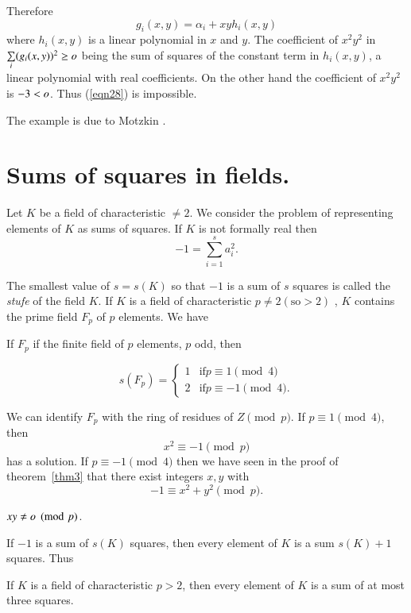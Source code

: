 Therefore
$$
g_i(x,y)=\alpha_i+xy h_i(x,y)
$$
where $h_i(x,y)$ is a linear polynomial in $x$ and $y$. The
coefficient of $x^{2}y^{2}$ in $\sum\limits_{i}(g_i(x,y))^{2}\geq o$
being the sum of squares of the constant term in $h_i(x,y)$, a linear
polynomial with real coefficients. On the other hand the coefficient
of $x^{2}y^{2}$ is $-3<o$. Thus (\ref{eqn28}) is impossible.

The example is due to Motzkin \cite{key4}.


\section{Sums of squares in fields.}\label{s4}

Let $K$ be a field of characteristic $\neq 2$. We consider the problem
of representing elements of $K$ as sums of squares. If $K$ is not
formally real then 
$$
-1=\sum\limits_{i=1}^{s}a^{2}_i.
$$

The smallest value of $s=s(K)$ so that $-1$ is a sum of $s$ squares is
called the \textit{stufe} of the field $K$. If $K$ is a field of
characteristic $p\neq 2 (\text{so} >2)$ , $K$ contains the prime field
$F_p$ of $p$ elements. We have

\begin{prop}\label{prop4}
If $F_p$ if the finite field of $p$ elements, $p$ odd, then 
\end{prop}

\begin{equation*}
s(F_p) =
\begin{cases}
1 & \text{if} p\equiv 1\pmod 4\\
2 & \text{if} p\equiv-1\pmod 4.
\end{cases}
\end{equation*}


\begin{Proof}
We can identify $F_p$ with the ring of residues of $Z \pmod p$. If
$p\equiv 1 \pmod 4$, then 
$$
x^{2}\equiv -1\pmod p
$$
has a solution. If $p\equiv-1 \pmod 4$ then we have seen in the proof
of theorem~\ref{thm3} that there exist integers $x,y$ with 
$$
-1 \equiv x^{2}+y^{2}\pmod p.
$$

$xy\neq o \pmod p$.

If $-1$ is a sum of $s(K)$ squares, then every element of $K$ is a sum
$s(K)+1$ squares. Thus 
\enprf
\end{Proof}


\begin{prop}\label{prop5}
If $K$ is a field of characteristic $p>2$, then every element of $K$
is a sum of at most three squares.
\end{prop}

